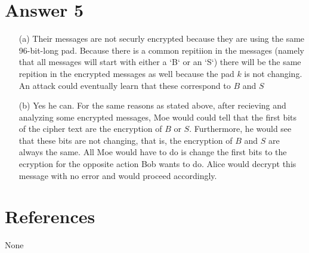 \documentclass[11pt]{article}
\theoremstyle{definition}
\begin{document}
\section*{Answer 5}

	\begin{enumerate}
		\item[(a)] Their messages are not securly encrypted because they are using the same 96-bit-long pad.  Because there is a common repitiion in the messages (namely that all messages will start with either a `B` or an `S`) there will be the same repition in the encrypted messages as well because the pad $k$ is not changing.  An attack could eventually learn that these correspond to $B$ and $S$

		\item[(b)] Yes he can.  For the same reasons as stated above, after recieving and analyzing some encrypted messages, Moe would could tell that the first bits of the cipher text are the encryption of $B$ or $S$.  Furthermore, he would see that these bits are not changing, that is, the encryption of $B$ and $S$ are always the same.  All Moe would have to do is change the first bits to the ecryption for the opposite action Bob wants to do.  Alice would decrypt this message with no error and would proceed accordingly.
	\end{enumerate}


\noindent\hrulefill


\section*{References}

None
\end{document}
